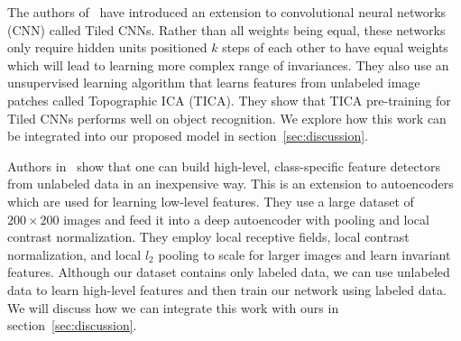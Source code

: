 \documentclass{article} %
\begin{document}
The authors of~\cite{nipsandrewng} have introduced an extension to convolutional neural networks (CNN) called Tiled CNNs. Rather than all weights being equal, these networks only require hidden units positioned $k$ steps of each other to have equal weights which will lead to learning more complex range of invariances. 
They also use an unsupervised learning algorithm that learns features from unlabeled image patches called Topographic ICA (TICA). They show that TICA pre-training for Tiled CNNs performs well on object recognition. We explore how this work can be integrated into our proposed model in section~\ref{sec:discussion}.

Authors in~\cite{icml_unsupervised} show that one can build high-level, class-specific feature detectors from unlabeled data in an inexpensive way. This is an extension to autoencoders which are used for learning low-level features. They use a large dataset of $200\times200$ images and feed it into a deep autoencoder with pooling and local contrast normalization. They employ local receptive fields,  local contrast normalization, and local $l_2$ pooling to scale for larger images and learn invariant features. Although our dataset contains only labeled data, we can use unlabeled data to learn high-level features and then train our network using labeled data. We will discuss how we can integrate this work with ours in section~\ref{sec:discussion}.
\end{document}
